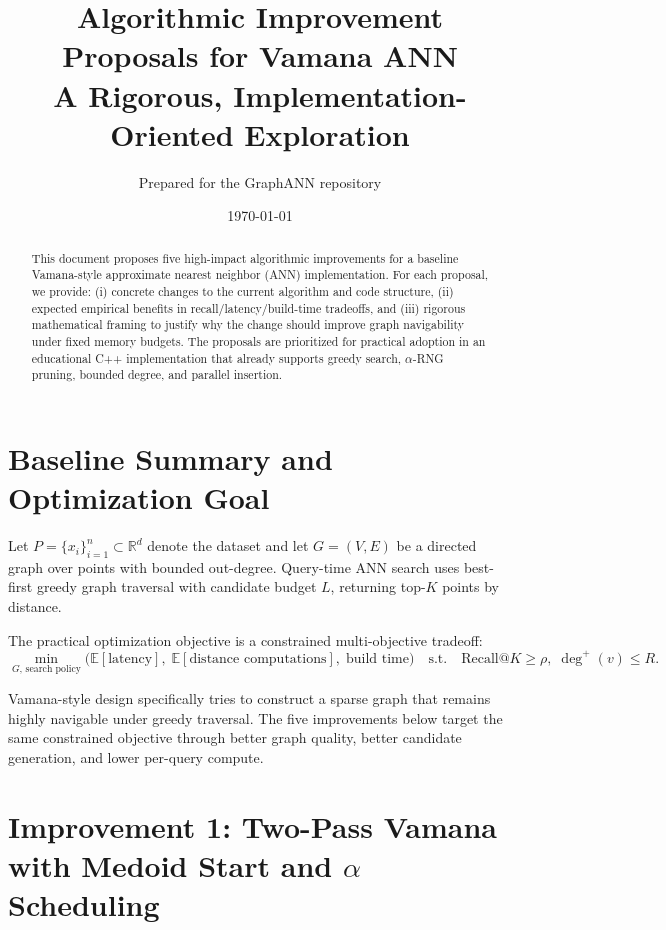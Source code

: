 \documentclass[11pt]{article}
\title{Algorithmic Improvement Proposals for Vamana ANN\\
\large A Rigorous, Implementation-Oriented Exploration}
\author{Prepared for the GraphANN repository}
\date{\today}
\begin{document}
\maketitle

\begin{abstract}
This document proposes five high-impact algorithmic improvements for a baseline Vamana-style approximate nearest neighbor (ANN) implementation. For each proposal, we provide: (i) concrete changes to the current algorithm and code structure, (ii) expected empirical benefits in recall/latency/build-time tradeoffs, and (iii) rigorous mathematical framing to justify why the change should improve graph navigability under fixed memory budgets. The proposals are prioritized for practical adoption in an educational C++ implementation that already supports greedy search, $\alpha$-RNG pruning, bounded degree, and parallel insertion.
\end{abstract}

\section{Baseline Summary and Optimization Goal}

Let $P=\{x_i\}_{i=1}^n \subset \mathbb{R}^d$ denote the dataset and let $G=(V,E)$ be a directed graph over points with bounded out-degree. Query-time ANN search uses best-first greedy graph traversal with candidate budget $L$, returning top-$K$ points by distance.

The practical optimization objective is a constrained multi-objective tradeoff:
\begin{equation}
\min_{G,\,\text{search policy}} \Big(\mathbb{E}[\text{latency}],\; \mathbb{E}[\text{distance computations}],\; \text{build time}\Big)
\quad\text{s.t.}\quad \text{Recall@}K \ge \rho,\; \deg^+(v) \le R.
\end{equation}

Vamana-style design specifically tries to construct a sparse graph that remains highly navigable under greedy traversal. The five improvements below target the same constrained objective through better graph quality, better candidate generation, and lower per-query compute.

\section{Improvement 1: Two-Pass Vamana with Medoid Start and $\alpha$ Scheduling}
\end{document}
